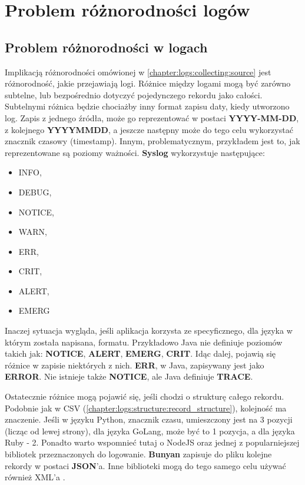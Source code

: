 \section{Problem różnorodności logów}
\label{chapter:logs:normalize}

    \subsection{Problem różnorodności w logach}
    \label{chapter:logs:normalize:differences}
    Implikacją różnorodności omówionej w \ref{chapter:logs:collecting:source} jest różnorodność, jakie przejawiają logi.
    Różnice między logami mogą być zarówno subtelne, lub bezpośrednio dotyczyć pojedynczego rekordu jako całości.
    Subtelnymi różnica będzie chociażby inny format zapisu daty, kiedy utworzono log. Zapis z jednego źródła, może
    go reprezentować w postaci \textbf{YYYY-MM-DD}, z kolejnego \textbf{YYYYMMDD}, a jeszcze następny może
    do tego celu wykorzystać znacznik czasowy (timestamp). Innym, problematycznym, przykładem jest to,
    jak reprezentowane są poziomy ważności. \textbf{Syslog} wykorzystuje następujące:
    \begin{itemize}
        \item INFO,
        \item DEBUG,
        \item NOTICE,
        \item WARN,
        \item ERR,
        \item CRIT,
        \item ALERT,
        \item EMERG \cite{logging_log_management}
    \end{itemize} 
    Inaczej sytuacja wygląda, jeśli aplikacja korzysta ze specyficznego, dla języka w którym została napisana, formatu.
    Przykładowo Java nie definiuje poziomów takich jak: \textbf{NOTICE}, \textbf{ALERT}, \textbf{EMERG}, \textbf{CRIT}.
    Idąc dalej, pojawią się różnice w zapisie niektórych z nich. \textbf{ERR}, w Java, zapisywany jest jako \textbf{ERROR}.
    Nie istnieje także \textbf{NOTICE}, ale Java definiuje \textbf{TRACE}.
    
    Ostatecznie różnice mogą pojawić się, jeśli chodzi o strukturę całego rekordu.
    Podobnie jak w CSV (\ref{chapter:logs:structure:record_structure}),
    kolejność ma znaczenie. Jeśli w języku Python, znacznik czasu, umieszczony jest na 3 pozycji 
    (licząc od lewej strony), dla języka GoLang, może być to
    1 pozycja, a dla języka Ruby - 2. Ponadto warto wspomnieć tutaj o NodeJS oraz jednej z
    popularniejszej bibliotek przeznaczonych do logowanie. \textbf{Bunyan} zapisuje do pliku kolejne 
    rekordy w postaci \textbf{JSON}'a. Inne biblioteki mogą do tego samego celu używać również XML'a \cite{log_management_explained}.
    
